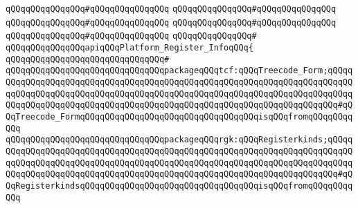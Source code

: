 \verb|qQQqqQQqqQQqqQQq#qQQqqQQqqQQqqQQq|\newline
\verb|qQQqqQQqqQQqqQQq#qQQqqQQqqQQqqQQq|\newline
\verb|qQQqqQQqqQQqqQQq#qQQqqQQqqQQqqQQq|\newline
\verb|qQQqqQQqqQQqqQQq#qQQqqQQqqQQqqQQq|\newline
\verb|qQQqqQQqqQQqqQQq#qQQqqQQqqQQqqQQq|\newline
\verb|qQQqqQQqqQQqqQQq#|\newline
\verb|qQQqqQQqqQQqqQQqapiqQQqPlatform_Register_InfoqQQq{|\newline
\verb|qQQqqQQqqQQqqQQqqQQqqQQqqQQqqQQq#|\newline
\verb|qQQqqQQqqQQqqQQqqQQqqQQqqQQqqQQqpackageqQQqtcf:qQQqTreecode_Form;qQQqqQQqqQQqqQQqqQQqqQQqqQQqqQQqqQQqqQQqqQQqqQQqqQQqqQQqqQQqqQQqqQQqqQQqqQQqqQQqqQQqqQQqqQQqqQQqqQQqqQQqqQQqqQQqqQQqqQQqqQQqqQQqqQQqqQQqqQQqqQQqqQQqqQQqqQQqqQQqqQQqqQQqqQQqqQQqqQQqqQQqqQQqqQQqqQQqqQQqqQQqqQQqqQQq#qQQqTreecode_FormqQQqqQQqqQQqqQQqqQQqqQQqqQQqqQQqqQQqisqQQqfromqQQqqQQqqQQq|\newline
\verb|qQQqqQQqqQQqqQQqqQQqqQQqqQQqqQQqpackageqQQqrgk:qQQqRegisterkinds;qQQqqQQqqQQqqQQqqQQqqQQqqQQqqQQqqQQqqQQqqQQqqQQqqQQqqQQqqQQqqQQqqQQqqQQqqQQqqQQqqQQqqQQqqQQqqQQqqQQqqQQqqQQqqQQqqQQqqQQqqQQqqQQqqQQqqQQqqQQqqQQqqQQqqQQqqQQqqQQqqQQqqQQqqQQqqQQqqQQqqQQqqQQqqQQqqQQqqQQqqQQqqQQqqQQq#qQQqRegisterkindsqQQqqQQqqQQqqQQqqQQqqQQqqQQqqQQqqQQqisqQQqfromqQQqqQQqqQQq|\newline
\newline
